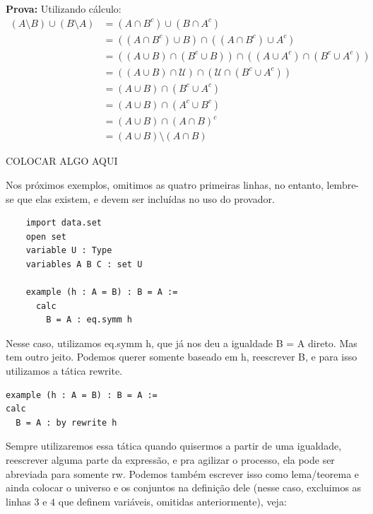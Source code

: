 \textbf{Prova:} Utilizando cálculo:
\begin{equation*}
\begin{aligned}
  (A \setminus B) \cup (B \setminus A) &= (A \cap B^c) \cup (B \cap A^c)\\
  &= ((A \cap B^c) \cup B) \cap ((A \cap B^c) \cup A^c)\\
  &= ((A \cup B) \cap (B^c \cup B)) \cap ((A \cup A^c) \cap (B^c \cup A^c))\\
  &= ((A \cup B) \cap \mathcal U) \cap (\mathcal U \cap (B^c \cup A^c))\\
  &= (A \cup B) \cap (B^c \cup A^c)\\
  &= (A \cup B) \cap (A^c \cup B^c)\\
  &= (A \cup B) \cap (A \cap B)^c\\
  &= (A \cup B) \setminus (A \cap B)
\end{aligned}
\end{equation*}

COLOCAR ALGO AQUI

Nos próximos exemplos, omitimos as quatro primeiras linhas, no entanto, lembre-se que elas existem, e devem ser incluídas no uso do provador.

\begin{lstlisting}
    import data.set
    open set
    variable U : Type
    variables A B C : set U

    example (h : A = B) : B = A :=
      calc
        B = A : eq.symm h
\end{lstlisting}

Nesse caso, utilizamos {\selectfont eq.symm h}, que já nos deu a igualdade {\selectfont B = A} direto. Mas tem outro jeito. Podemos querer somente baseado em {\selectfont h}, reescrever {\selectfont B}, e para isso utilizamos a tática {\selectfont rewrite}.

\begin{lstlisting}
example (h : A = B) : B = A :=
calc
  B = A : by rewrite h \end{lstlisting}

Sempre utilizaremos essa tática quando quisermos a partir de uma igualdade, reescrever alguma parte da expressão, e pra agilizar o processo, ela pode ser abreviada para somente {\selectfont rw}.
Podemos também escrever isso como lema/teorema e ainda colocar o universo e os conjuntos na definição dele (nesse caso, excluimos as linhas $3$ e $4$ que definem variáveis, omitidas anteriormente), veja:


